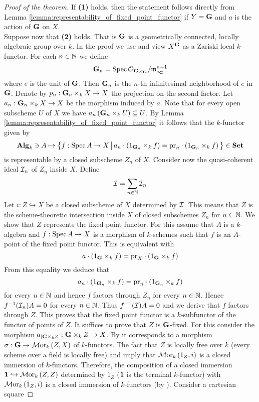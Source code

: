 \begin{proof}[Proof of the theorem]
If \textbf{(1)} holds, then the statement follows directly from Lemma \ref{lemma:representability_of_fixed_point_functor} if $Y = \mathbf{G}$ and $a$ is the action of $\mathbf{G}$ on $X$.\\
Suppose now that \textbf{(2)} holds. That is $\mathbf{G}$ is a geometrically connected, locally algebraic group over $k$. In the proof we use {\cite[Corollary 3.6]{kfunctors}} and view $X^{\mathbf{G}}$ as a Zariski local $k$-functor. For each $n\in {\mathbb N}$ we define
$$\mathbf{G}_n = \mathrm{Spec}\, {\mathcal O}_{\mathbf{G},e_{\mathbf{G}}}/\mathfrak{m}_{e_{\mathbf{G}}}^{n+1}$$
where $e$ is the unit of $\mathbf{G}$. Then $\mathbf{G}_n$ is the $n$-th infinitesimal neighborhood of $e$ in $\mathbf{G}$. Denote by $p_n:\mathbf{G}_n\times_kX\rightarrow X$ the projection on the second factor. Let $a_n:\mathbf{G}_n\times_kX\rightarrow X$ be the morphism induced by $a$. Note that for every open subscheme $U$ of $X$ we have $a_n\left(\mathbf{G}_n\times_kU\right)\subseteq U$. By Lemma \ref{lemma:representability_of_fixed_point_functor} it follows that the $k$-functor given by
$$\mathbf{Alg}_k \ni A \mapsto \big\{f:\mathrm{Spec}\, A\rightarrow X\,\big|\,a_n\cdot \left(1_{\mathbf{G}_n}\times_k f\right) = \mathrm{pr}_n\cdot \left(1_{\mathbf{G}_n}\times_kf\right)\big\} \in \mathbf{Set}$$
is representable by a closed subscheme $Z_n$ of $X$. Consider now the quasi-coherent ideal ${\mathcal I}_n$ of $Z_n$ inside $X$. Define
$${\mathcal I} = \sum_{n\in {\mathbb N}}{\mathcal I}_n$$
Let $i:Z\hookrightarrow X$ be a closed subscheme of $X$ determined by ${\mathcal I}$. This means that $Z$ is the scheme-theoretic intersection inside $X$ of closed subschemes $Z_n$ for $n\in {\mathbb N}$. We show that $Z$ represents the fixed point functor. For this assume that $A$ is a $k$-algebra and $f:\mathrm{Spec}\, A\rightarrow X$ is a morphism of $k$-schemes such that $f$ is an $A$-point of the fixed point functor. This is equivalent with
$$a\cdot \left(1_{\mathbf{G}}\times_k f\right) = \mathrm{pr}_X\cdot \left(1_{\mathbf{G}}\times_kf\right)$$
From this equality we deduce that
$$a_n\cdot \left(1_{\mathbf{G}_n}\times_k f\right) = \mathrm{pr}_n\cdot \left(1_{\mathbf{G}_n}\times_kf\right)$$
for every $n\in {\mathbb N}$ and hence $f$ factors through $Z_n$ for every $n\in {\mathbb N}$. Hence $f^{-1}({\mathcal I}_n)A = 0$ for every $n\in {\mathbb N}$. Thus $f^{-1}({\mathcal I})A = 0$ and we derive that $f$ factors through $Z$. This proves that the fixed point functor is a $k$-subfunctor of the functor of points of $Z$. It suffices to prove that $Z$ is $\mathbf{G}$-fixed. For this consider the morphism $a_{\mid \mathbf{G}\times_kZ}:\mathbf{G}\times_kZ\rightarrow X$. By {\cite[Theorem 2.6]{kfunctors}} it corresponds to a morphism $\sigma:\mathbf{G} \rightarrow \mathcal{M}\mathrm{or}_k\left(Z,X\right)$ of $k$-functors. The fact that $Z$ is locally free over $k$ (every scheme over a field is locally free) and {\cite[Theorem 8.2]{kfunctors}} imply that $\mathcal{M}\mathrm{or}_k\left(1_Z,i\right)$ is a closed immersion of $k$-functors. Therefore, the composition of a closed immersion $\mathbf{1}\hookrightarrow \mathcal{M}\mathrm{or}_k\left(Z,Z\right)$ determined by $1_Z$ ($\mathbf{1}$ is the terminal $k$-functor) with $\mathcal{M}\mathrm{or}_k\left(1_Z,i\right)$ is a closed immersion of $k$-functors (by {\cite[Fact 5.8]{kfunctors}}). Consider a cartesian square

\end{proof}
